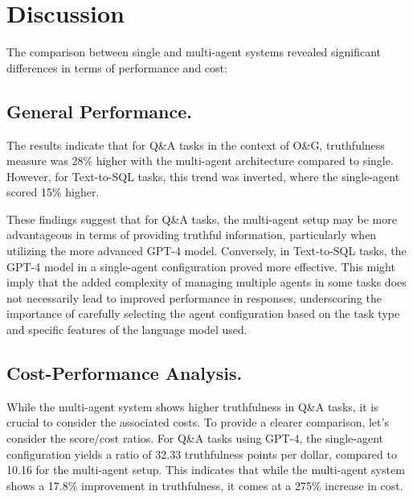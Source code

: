             

    \section{Discussion}

        The comparison between single and multi-agent systems revealed significant differences in terms of performance and cost:
        
        \subsection{General Performance.}     
            The results indicate that for Q\&A tasks in the context of O\&G, truthfulness measure was 28\% higher with the multi-agent architecture compared to single. However, for Text-to-SQL tasks, this trend was inverted, where the single-agent scored 15\% higher.

            These findings suggest that for Q\&A tasks, the multi-agent setup may be more advantageous in terms of providing truthful information, particularly when utilizing the more advanced GPT-4 model. Conversely, in Text-to-SQL tasks, the GPT-4 model in a single-agent configuration proved more effective. This might imply that the added complexity of managing multiple agents in some tasks does not necessarily lead to improved performance in responses, underscoring the importance of carefully selecting the agent configuration based on the task type and specific features of the language model used.
                
        \subsection{Cost-Performance Analysis.}
            While the multi-agent system shows higher truthfulness in Q\&A tasks, it is crucial to consider the associated costs. 
            To provide a clearer comparison, let's consider the score/cost ratios. For Q\&A tasks using GPT-4, the single-agent configuration yields a ratio of 32.33 truthfulness points per dollar, compared to 10.16 for the multi-agent setup. This indicates that while the multi-agent system shows a 17.8\% improvement in truthfulness, it comes at a 275\% increase in cost.
            
